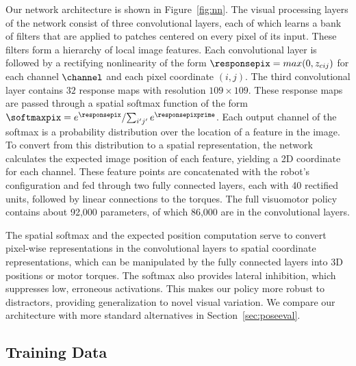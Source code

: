 \documentclass[conference]{IEEEtran}
\begin{document}
Our network architecture is shown in Figure~\ref{fig:nn}. The visual processing layers of the network consist of three convolutional layers, each of which learns a bank of filters that are applied to patches centered on every pixel of its input. These filters form a hierarchy of local image features. Each convolutional layer is followed by a rectifying nonlinearity of the form $\responsepix=max(0,z_{cij})$ for each channel $\channel$ and each pixel coordinate $(i,j)$. The third convolutional layer contains $32$ response maps with resolution $109 \times 109$. These response maps are passed through a spatial softmax function of the form $\softmaxpix = {e^{\responsepix}}/{\sum_{i' j'}{e^{\responsepixprime}}}$.
Each output channel of the softmax is a probability distribution over the location of a feature in the image. To convert from this distribution to a spatial representation, the network calculates the expected image position of each feature, yielding a 2D coordinate for each channel. These feature points are concatenated with the robot's configuration and fed through two fully connected layers, each with 40 rectified units, followed by linear connections to the torques. The full visuomotor policy contains about 92,000 parameters, of which 86,000 are in the convolutional layers.

The spatial softmax and the expected position computation serve to convert pixel-wise representations in the convolutional layers to spatial coordinate representations, which can be manipulated by the fully connected layers into 3D positions or motor torques. The softmax also provides lateral inhibition, which suppresses low, erroneous activations.
This makes our policy more robust to distractors, providing generalization to novel visual variation. We compare our architecture with more standard alternatives in Section~\ref{sec:poseeval}.


\subsection{Training Data}
\label{sec:training}
\end{document}
